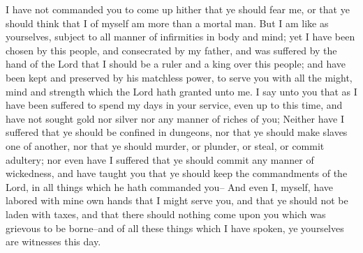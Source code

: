 \bverse \iffalse I have not commanded you to come up hither that ye should fear me, or that ye should think that I of myself am more than a mortal man. \fi
I have not commanded you to come up hither that ye should fear me, or that ye should think that I of myself am more than a mortal man.
\bverse \iffalse But I am like as yourselves, subject to all manner of infirmities in body and mind; yet I have been chosen by this people, and consecrated by my father, and was suffered by the hand of the Lord that I should be a ruler and a king over this people; and have been kept and preserved by his matchless power, to serve you with all the might, mind and strength which the Lord hath granted unto me. \fi
But I am like as yourselves, subject to all manner of infirmities in body and mind; yet I have been chosen by this people, and consecrated by my father, and was suffered by the hand of the Lord that I should be a ruler and a king over this people; and have been kept and preserved by his matchless power, to serve you with all the might, mind and strength which the Lord hath granted unto me.
\bverse \iffalse I say unto you that as I have been suffered to spend my days in your service, even up to this time, and have not sought gold nor silver nor any manner of riches of you; \fi
I say unto you that as I have been suffered to spend my days in your service, even up to this time, and have not sought gold nor silver nor any manner of riches of you;
\bverse \iffalse Neither have I suffered that ye should be confined in dungeons, nor that ye should make slaves one of another, nor that ye should murder, or plunder, or steal, or commit adultery; nor even have I suffered that ye should commit any manner of wickedness, and have taught you that ye should keep the commandments of the Lord, in all things which he hath commanded you-- \fi
Neither have I suffered that ye should be confined in dungeons, nor that ye should make slaves one of another, nor that ye should murder, or plunder, or steal, or commit adultery; nor even have I suffered that ye should commit any manner of wickedness, and have taught you that ye should keep the commandments of the Lord, in all things which he hath commanded you--
\bverse \iffalse And even I, myself, have labored with mine own hands that I might serve you, and that ye should not be laden with taxes, and that there should nothing come upon you which was grievous to be borne--and of all these things which I have spoken, ye yourselves are witnesses this day. \fi
And even I, myself, have labored with mine own hands that I might serve you, and that ye should not be laden with taxes, and that there should nothing come upon you which was grievous to be borne--and of all these things which I have spoken, ye yourselves are witnesses this day.
